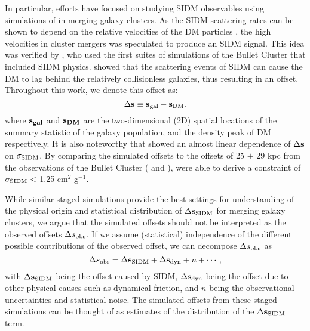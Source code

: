 In particular, efforts have focused on studying SIDM observables 
using simulations of in merging galaxy clusters.
As the SIDM scattering rates can be shown to depend on the 
relative velocities of the DM particles \citep{Markevitch2004}, the high velocities 
in cluster mergers was speculated to produce an SIDM signal. This idea was verified by 
\cite{Randall2008d}, who used the first suites of simulations of the
Bullet Cluster that included SIDM physics. 
\cite{Randall2008d} showed that the scattering events of SIDM can cause the DM
to lag behind the relatively collisionless galaxies, thus resulting in an offset.
Throughout this work, we denote this offset as:
\begin{equation}
	\Delta {\bf s} \equiv {\bf s}_{\rm gal} - {\bf s}_{\rm DM}.
	\label{eq:offset}
\end{equation}
where $\bf{s}_{gal}$ and $\bf{s}_{DM}$ are the two-dimensional (2D) spatial
locations of the summary statistic of the galaxy population, and the density
peak of DM respectively. 
It is also noteworthy that \cite{Randall2008d} showed an almost linear dependence of
$\Delta {\bf s}$ on $\sigma_{\rm SIDM}$. 
By comparing the simulated offsets to the offsets of 25 $\pm$ 29 kpc from 
the observations of the Bullet Cluster
(\citealt{Markevitch2004} and \citealt{Bradac2006b}),
\cite{Randall2008d} were able to derive a constraint of $\sigma_{\rm SIDM} <$ 
1.25 cm$^2$ g$^{-1}$.  

While similar staged simulations provide the best settings 
for understanding of the physical origin and statistical distribution of $\Delta {\bf s}_{{\rm SIDM}}$
for merging galaxy clusters, 
we argue that the simulated offsets should not be interpreted as the observed
offsets $\Delta s_{\rm obs}$.
If we assume (statistical) independence of 
the different possible contributions of the observed 
offset, we can decompose $\Delta s_{\rm obs}$  as
\begin{equation}
	\Delta s_{\rm obs} = \Delta {\bf s}_{{\rm SIDM}} + \Delta {\bf s}_{\rm dyn} + n + \cdots,
	\label{eq:signal_and_noise}
\end{equation}
with $\Delta {\bf s}_{{\rm SIDM}}$ being the offset caused by SIDM, 
$\Delta {\bf s}_{\rm dyn}$ being the offset due to other physical causes such as
dynamical friction, and $n$ being the observational uncertainties and statistical noise.
The simulated offsets from these staged simulations can be thought of as  
estimates of the distribution of the $\Delta {\bf s}_{{\rm SIDM}}$ term.

